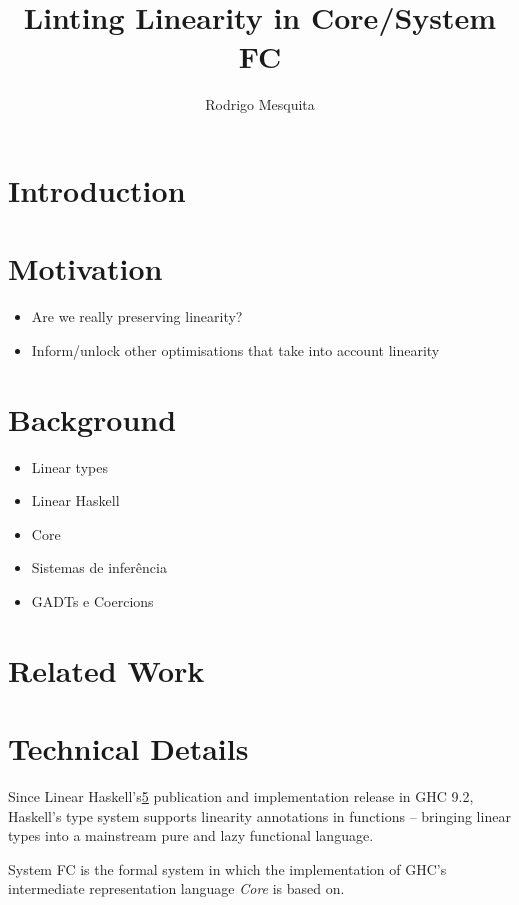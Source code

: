 \documentclass[a4paper, draft]{article}
\title{Linting Linearity in Core/System FC}
\author{Rodrigo Mesquita}
\begin{document}
\maketitle

\section{Introduction}



\section{Motivation}

\begin{itemize}
    \item Are we really preserving linearity?
    \item Inform/unlock other optimisations that take into account linearity
\end{itemize}


\section{Background}

\begin{itemize}
    \item Linear types
    \item Linear Haskell
    \item Core
    \item Sistemas de inferência
    \item GADTs e Coercions
\end{itemize}

\section{Related Work}


\section{Technical Details}

Since Linear Haskell's\ref{}
publication and implementation release in GHC 9.2, Haskell's type system
supports linearity annotations in functions -- bringing linear types into a
mainstream pure and lazy functional language.

System FC is the formal system in which the implementation of GHC's intermediate
representation language \emph{Core} is based on.
\end{document}
